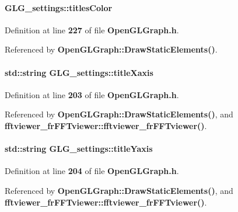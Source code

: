 \paragraph[{titles\+Color}]{ G\+L\+G\+\_\+settings\+::titles\+Color}\label{structGLG__settings_ab142d85e5d4e29dfb12dedff4c91281b}


Definition at line {\bf 227} of file {\bf Open\+G\+L\+Graph.\+h}.



Referenced by {\bf Open\+G\+L\+Graph\+::\+Draw\+Static\+Elements()}.

\paragraph[{title\+Xaxis}]{\setlength{\rightskip}{0pt plus 5cm}std\+::string G\+L\+G\+\_\+settings\+::title\+Xaxis}\label{structGLG__settings_a09ed2cd8134b97152bdd7c9d656f8ba9}


Definition at line {\bf 203} of file {\bf Open\+G\+L\+Graph.\+h}.



Referenced by {\bf Open\+G\+L\+Graph\+::\+Draw\+Static\+Elements()}, and {\bf fftviewer\+\_\+fr\+F\+F\+Tviewer\+::fftviewer\+\_\+fr\+F\+F\+Tviewer()}.

\paragraph[{title\+Yaxis}]{\setlength{\rightskip}{0pt plus 5cm}std\+::string G\+L\+G\+\_\+settings\+::title\+Yaxis}\label{structGLG__settings_a8a919901443f89f68d60526388bb327a}


Definition at line {\bf 204} of file {\bf Open\+G\+L\+Graph.\+h}.



Referenced by {\bf Open\+G\+L\+Graph\+::\+Draw\+Static\+Elements()}, and {\bf fftviewer\+\_\+fr\+F\+F\+Tviewer\+::fftviewer\+\_\+fr\+F\+F\+Tviewer()}.

